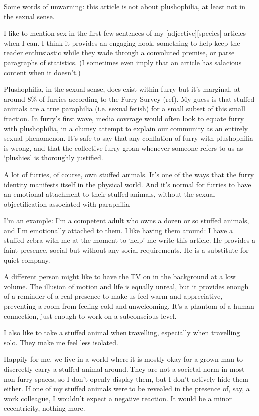 
Some words of unwarning: this article is not about plushophilia, at least not in the sexual sense.

I like to mention sex in the first few sentences of my [adjective][species] articles when I can. I think it provides an engaging hook, something to help keep the reader enthusiastic while they wade through a convoluted premise, or parse paragraphs of statistics. (I sometimes even imply that an article has salacious content when it doesn't.)

Plushophilia, in the sexual sense, does exist within furry but it's marginal, at around 8\% of furries according to the Furry Survey (ref). My guess is that stuffed animals are a true paraphilia (i.e. sexual fetish) for a small subset of this small fraction. In furry's first wave, media coverage would often look to equate furry with plushophilia, in a clumsy attempt to explain our community as an entirely sexual phenomenon. It's safe to say that any conflation of furry with plushophilia is wrong, and that the collective furry groan whenever someone refers to us as `plushies' is thoroughly justified.

A lot of furries, of course, own stuffed animals. It's one of the ways that the furry identity manifests itself in the physical world. And it's normal for furries to have an emotional attachment to their stuffed animals, without the sexual objectification associated with paraphilia.

I'm an example: I'm a competent adult who owns a dozen or so stuffed animals, and I'm emotionally attached to them. I like having them around: I have a stuffed zebra with me at the moment to `help' me write this article. He provides a faint presence, social but without any social requirements. He is a substitute for quiet company.

A different person might like to have the TV on in the background at a low volume. The illusion of motion and life is equally unreal, but it provides enough of a reminder of a real presence to make us feel warm and appreciative, preventing a room from feeling cold and unwelcoming. It's a phantom of a human connection, just enough to work on a subconscious level.

I also like to take a stuffed animal when travelling, especially when travelling solo. They make me feel less isolated.

Happily for me, we live in a world where it is mostly okay for a grown man to discreetly carry a stuffed animal around. They are not a societal norm in most non-furry spaces, so I don't openly display them, but I don't actively hide them either. If one of my stuffed animals were to be revealed in the presence of, say, a work colleague, I wouldn't expect a negative reaction. It would be a minor eccentricity, nothing more.


